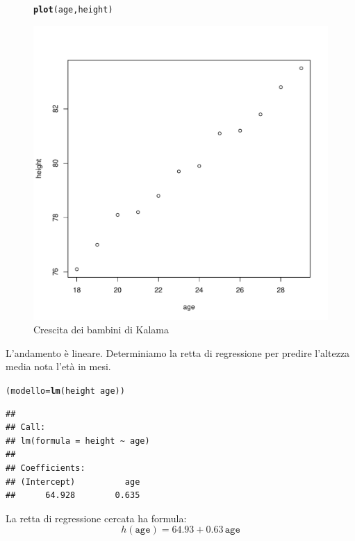 \documentclass[onecolumn,12pt]{book}\usepackage[]{graphicx}\usepackage[]{color}
\makeatletter
\def\maxwidth{ %
  \ifdim\Gin@nat@width>\linewidth
    \linewidth
  \else
    \Gin@nat@width
  \fi
}
\newcommand{\hlopt}[1]{\textcolor[rgb]{0,0,0}{#1}}%
\newcommand{\hlstd}[1]{\textcolor[rgb]{0.345,0.345,0.345}{#1}}%
\newcommand{\hlkwb}[1]{\textcolor[rgb]{0.69,0.353,0.396}{#1}}%
\newcommand{\hlkwd}[1]{\textcolor[rgb]{0.737,0.353,0.396}{\textbf{#1}}}%
\newenvironment{kframe}{%
 \def\at@end@of@kframe{}%
 \ifinner\ifhmode%
  \def\at@end@of@kframe{\end{minipage}}%
  \begin{minipage}{\columnwidth}%
 \fi\fi%
 \def\FrameCommand##1{\hskip\@totalleftmargin \hskip-\fboxsep
 \colorbox{shadecolor}{##1}\hskip-\fboxsep
     \hskip-\linewidth \hskip-\@totalleftmargin \hskip\columnwidth}%
 \MakeFramed {\advance\hsize-\width
   \@totalleftmargin\z@ \linewidth\hsize
   \@setminipage}}%
 {\par\unskip\endMakeFramed%
 \at@end@of@kframe}
\newenvironment{knitrout}{}{} %
\makeatother
\begin{document}
\begin{figure}[htbp]
\begin{center}
\begin{knitrout}
\color{fgcolor}\begin{kframe}
\begin{alltt}
\hlkwd{plot}\hlstd{(age,height)}
\end{alltt}
\end{kframe}
\includegraphics[width=\maxwidth]{figure/unnamed-chunk-122-1} 

\end{knitrout}
\caption{Crescita dei bambini di Kalama}
\label{kalama}
\end{center}
\end{figure}
L'andamento \`e lineare. Determiniamo la retta di regressione
per predire l'altezza media nota l'et\`a in mesi.
\begin{knitrout}
\color{fgcolor}\begin{kframe}
\begin{alltt}
\hlstd{(modello}\hlkwb{=}\hlkwd{lm}\hlstd{(height}\hlopt{~}\hlstd{age))}
\end{alltt}
\begin{verbatim}
## 
## Call:
## lm(formula = height ~ age)
## 
## Coefficients:
## (Intercept)          age  
##      64.928        0.635
\end{verbatim}
\end{kframe}
\end{knitrout}
La retta di regressione cercata ha formula:
$$h(\texttt{age})=64.93+ 0.63\, \texttt{age}$$
\end{document}
